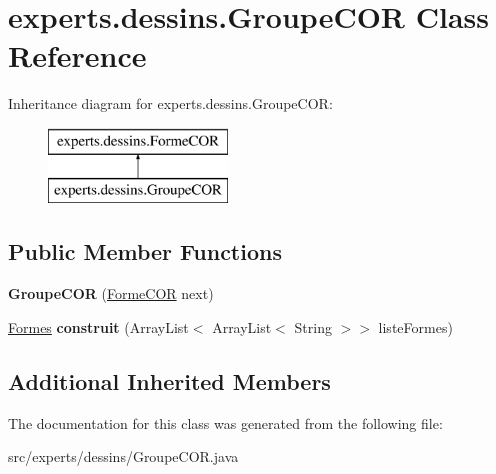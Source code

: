 \hypertarget{classexperts_1_1dessins_1_1_groupe_c_o_r}{}\section{experts.\+dessins.\+Groupe\+C\+OR Class Reference}
\label{classexperts_1_1dessins_1_1_groupe_c_o_r}
Inheritance diagram for experts.\+dessins.\+Groupe\+C\+OR\+:\begin{figure}[H]
\begin{center}
\leavevmode
\includegraphics[height=2.000000cm]{d3/d23/classexperts_1_1dessins_1_1_groupe_c_o_r}
\end{center}
\end{figure}
\subsection*{Public Member Functions}
\begin{DoxyCompactItemize}
\item 
\mbox{\label{classexperts_1_1dessins_1_1_groupe_c_o_r_a66efcb1a7a83de03987f1be9b408a0de}} 
{\bfseries Groupe\+C\+OR} (\mbox{\hyperlink{classexperts_1_1dessins_1_1_forme_c_o_r}{Forme\+C\+OR}} next)
\item 
\mbox{\label{classexperts_1_1dessins_1_1_groupe_c_o_r_ad334237854efb2d1780c3be464f29c08}} 
\mbox{\hyperlink{classdessin_1_1_formes}{Formes}} {\bfseries construit} (Array\+List$<$ Array\+List$<$ String $>$$>$ liste\+Formes)
\end{DoxyCompactItemize}
\subsection*{Additional Inherited Members}


The documentation for this class was generated from the following file\+:\begin{DoxyCompactItemize}
\item 
src/experts/dessins/Groupe\+C\+O\+R.\+java\end{DoxyCompactItemize}
